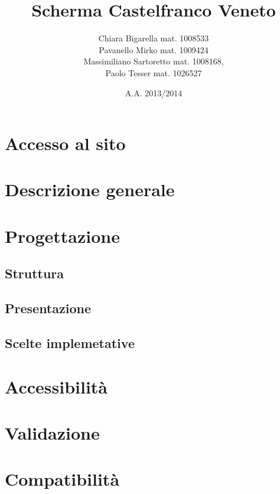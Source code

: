 
	
\title{\bfseries Scherma Castelfranco Veneto}
\author{Chiara Bigarella mat. 1008533\\Pavanello Mirko mat. 1009424 \\Massimiliano Sartoretto mat. 1008168,\\ Paolo Tesser mat. 1026527}
\date{A.A. 2013/2014}



\pagestyle{romano}
\newpage
	\tableofcontents
	\listoffigures
\newpage
{}
\pagestyle{std}


\newpage
\section{Accesso al sito}
	

\section{Descrizione generale}
	
	
\newpage
\section{Progettazione}
	\subsection{Struttura}
		
	\subsection{Presentazione}
		
	\subsection{Scelte implemetative}
		
\newpage
\section{Accessibilit\`a}
		

\newpage
\section{Validazione}
		

\newpage
\section{Compatibilit\`a}
	


